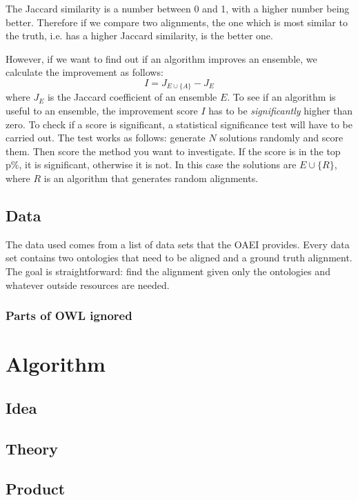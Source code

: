 \documentclass{article}
\begin{document}
 The Jaccard similarity is a number between 0 and 1, with a higher number being better. Therefore if we compare two alignments, the one which is most similar to the truth, i.e. has a higher Jaccard similarity, is the better one.
 
 However, if we want to find out if an algorithm improves an ensemble, we calculate the improvement as follows:
 \[
 I = J_{E\cup \{A\}} - J_E
 \]
 where $J_E$ is the Jaccard coefficient of an ensemble $E$.
 To see if an algorithm is useful to an ensemble, the improvement score $I$ has to be \emph{significantly} higher than zero. To check if a score is significant, a statistical significance test will have to be carried out. The test works as follows: generate $N$ solutions randomly and score them. Then score the method you want to investigate. If the score is in the top p\%, it is significant, otherwise it is not. In this case the solutions are $E\cup \{R\}$, where $R$ is an algorithm that generates random alignments.
 \subsection{Data}
 The data used comes from a list of data sets that the OAEI provides. %
 Every data set contains two ontologies that need to be aligned and a ground truth alignment. The goal is straightforward: find the alignment given only the ontologies and whatever outside resources are needed.

 \subsubsection{Parts of OWL ignored} 
 
 \section{Algorithm}
 \subsection{Idea}
 \subsection{Theory}
 \subsection{Product}
 
\end{document}
